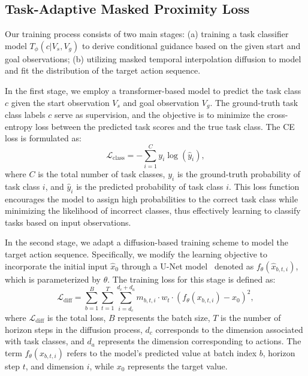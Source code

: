 \subsection{Task-Adaptive Masked Proximity Loss}
Our training process consists of two main stages: (a) training a task classifier model \( T_{\phi}(c|V_s, V_g) \) to derive conditional guidance based on the given start and goal observations; (b) utilizing masked temporal interpolation diffusion to model and fit the distribution of the target action sequence.

In the first stage, we employ a transformer-based model to predict the task class \( c \) given the start observation \( V_s \) and goal observation \( V_g \). The ground-truth task class labels \( c \) serve as supervision, and the objective is to minimize the cross-entropy loss between the predicted task scores and the true task class. The CE~\citep{mannor2005cross} loss is formulated as:
\begin{equation}
    \mathcal{L}_{\mathrm{class}} = -\sum_{i=1}^{C} y_i \log(\hat{y}_i),
\end{equation}
where \( C \) is the total number of task classes, \( y_i \) is the ground-truth probability of task class \( i \), and \( \hat{y}_i \) is the predicted probability of task class \( i \). This loss function encourages the model to assign high probabilities to the correct task class while minimizing the likelihood of incorrect classes, thus effectively learning to classify tasks based on input observations.

In the second stage, we adapt a diffusion-based training scheme to model the target action sequence. Specifically, we modify the learning objective to incorporate the initial input \( \hat{x}_0 \) through a U-Net model~\citep{ronneberger2015u} denoted as \( f_{\theta}(\hat{x}_{b,t,i}) \), which is parameterized by \( \theta \). The training loss for this stage is defined as:
\begin{equation}
\mathcal{L}_{\mathrm{diff}} = \sum_{b=1}^{B} \sum_{t=1}^{T} \sum_{i=d_c}^{d_c+d_a}  m_{b,t,i} \cdot w_t \cdot (f_{\theta}(x_{b,t,i}) - x_0)^2,
\end{equation}
where \( \mathcal{L}_{\mathrm{diff}} \) is the total loss, \( B \) represents the batch size, \( T \) is the number of horizon steps in the diffusion process, \( d_c \) corresponds to the dimension associated with task classes, and \( d_a \) represents the dimension corresponding to actions. The term \( f_{\theta}(x_{b,t,i}) \) refers to the model’s predicted value at batch index \( b \), horizon step \( t \), and dimension \( i \), while \( x_0 \) represents the target value.

